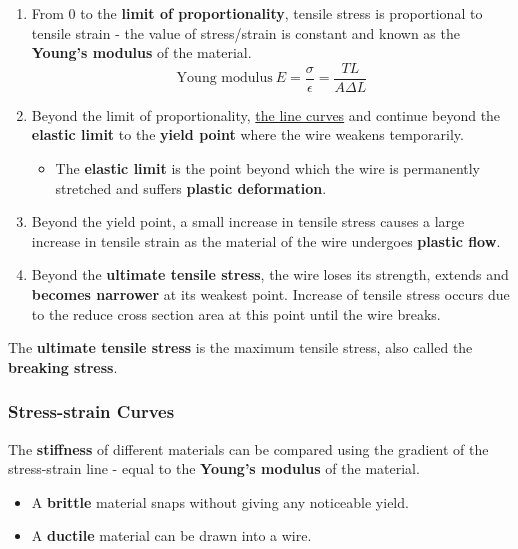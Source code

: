 \begin{enumerate}
    \item From 0 to the \textbf{limit of proportionality}, tensile stress is proportional to tensile strain - the value of stress/strain is constant and known as the \textbf{Young's modulus} of the material.
        $$\text{Young modulus}\ E=\frac{\sigma}{\epsilon}=\frac{TL}{A\Delta L}$$
    \item Beyond the limit of proportionality, \underline{the line curves} and continue beyond the \textbf{elastic limit} to the \textbf{yield point} where the wire weakens temporarily.
        \begin{itemize}
            \item The \textbf{elastic limit} is the point beyond which the wire is permanently stretched and suffers \textbf{plastic deformation}.
        \end{itemize}
    \item Beyond the yield point, a small increase in tensile stress causes a large increase in tensile strain as the material of the wire undergoes \textbf{plastic flow}.
    \item Beyond the \textbf{ultimate tensile stress}, the wire loses its strength, extends and \textbf{becomes narrower} at its weakest point. Increase of tensile stress occurs due to the reduce cross section area at this point until the wire breaks.
\end{enumerate}

The \textbf{ultimate tensile stress} is the maximum tensile stress, also called the \textbf{breaking stress}.

\subsubsection*{Stress-strain Curves}

The \textbf{stiffness} of different materials can be compared using the gradient of the stress-strain line - equal to the \textbf{Young's modulus} of the material.
\begin{itemize}
    \item A \textbf{brittle} material snaps without giving any noticeable yield.
    \item A \textbf{ductile} material can be drawn into a wire.
\end{itemize}
